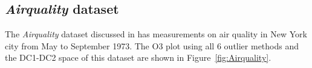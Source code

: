 \documentclass[letter,12pt]{article}
\begin{document}


\subsection{\textit{Airquality} dataset}\label{sec:ResWithVis4}

The \textit{Airquality} dataset discussed in \cite{john1983graphical} has measurements on air quality in New York city from May to September 1973. The O3 plot using all $6$ outlier methods and the DC1-DC2 space of this dataset are shown in Figure~\ref{fig:Airquality}.
\end{document}
